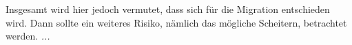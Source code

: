 Insgesamt wird hier jedoch vermutet, dass sich für die Migration entschieden wird. Dann sollte ein weiteres Risiko, nämlich das mögliche Scheitern, betrachtet werden. \textit{...}

